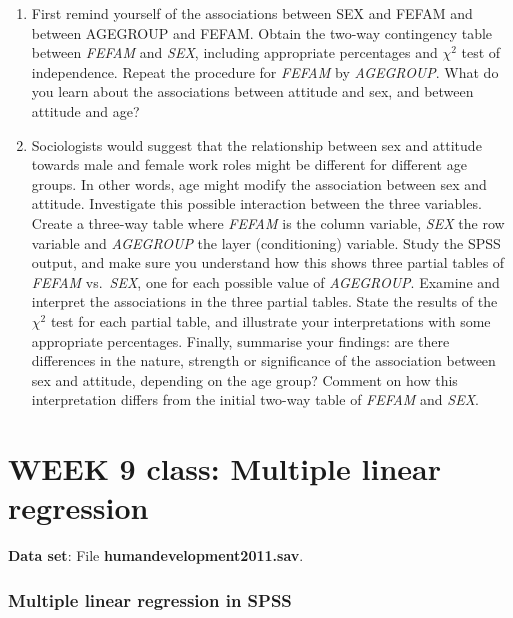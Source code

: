 \begin{enumerate}
\item
First remind yourself of the associations between SEX and FEFAM and between
AGEGROUP and FEFAM. Obtain the two-way contingency
table between \emph{FEFAM} and \emph{SEX}, including appropriate
percentages and $\chi^{2}$ test of independence. Repeat the procedure
for \emph{FEFAM} by \emph{AGEGROUP}. What do you learn about
the associations between attitude and sex, and between attitude and age?
\item
Sociologists would suggest that the relationship between sex and attitude towards
male and female work roles might be different for different age groups. In other
words, age might modify the association between sex and attitude. Investigate this
possible interaction between the three variables.
Create a three-way table where \emph{FEFAM} is the column
variable, \emph{SEX} the row variable  and \emph{AGEGROUP} the layer
(conditioning) variable. Study the SPSS output, and make sure you
understand how this shows three partial tables of \emph{FEFAM} vs.\
\emph{SEX}, one for each possible value of \emph{AGEGROUP}. Examine and
interpret the associations in the three partial tables. State the results of the
$\chi^{2}$ test for each partial table, and illustrate your interpretations with some
appropriate percentages. Finally, summarise your findings: are there
differences in the nature, strength or significance of the association
between sex and attitude, depending on the age group? Comment on how this interpretation
differs from the initial two-way table of \emph{FEFAM} and \emph{SEX}.
\end{enumerate}

\newpage

\section[Week 10: Multiple linear regression]{WEEK 9 class: Multiple linear regression}

\textbf{Data set}: File \textbf{humandevelopment2011.sav}.


\subsubsection{Multiple linear regression in SPSS}

